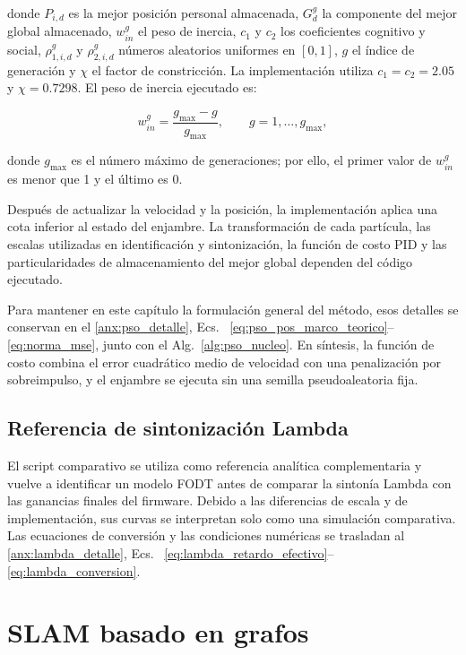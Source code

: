 \noindent donde $P_{i,d}$ es la mejor posición personal almacenada, $G_d^{g}$ la componente del mejor global almacenado, $w_{in}^{g}$ el peso de inercia, $c_1$ y $c_2$ los coeficientes cognitivo y social, $\rho_{1,i,d}^{g}$ y $\rho_{2,i,d}^{g}$ números aleatorios uniformes en $[0,1]$, $g$ el índice de generación y $\chi$ el factor de constricción. La implementación utiliza $c_1=c_2=2.05$ y $\chi=0.7298$. El peso de inercia ejecutado es:

\begin{equation}
w_{in}^{g}
=
\frac{g_{\max}-g}{g_{\max}},
\qquad
g=1,\ldots,g_{\max},
\label{eq:pso_inercia}
\end{equation}

\noindent donde $g_{\max}$ es el número máximo de generaciones; por ello, el primer valor de $w_{in}^{g}$ es menor que 1 y el último es 0.

Después de actualizar la velocidad y la posición, la implementación aplica
una cota inferior al estado del enjambre. La transformación de cada partícula,
las escalas utilizadas en identificación y sintonización, la función de costo
PID y las particularidades de almacenamiento del mejor global dependen del
código ejecutado.

Para mantener en este capítulo la formulación general del método, esos detalles
se conservan en el \ref{anx:pso_detalle}, Ecs.~
\eqref{eq:pso_pos_marco_teorico}--\eqref{eq:norma_mse}, junto con el
Alg.~\ref{alg:pso_nucleo}. En síntesis, la función de costo combina el error
cuadrático medio de velocidad con una penalización por sobreimpulso, y el
enjambre se ejecuta sin una semilla pseudoaleatoria fija.

\subsection{Referencia de sintonización Lambda}
\label{sec:lambda}

El script comparativo  se utiliza como
referencia analítica complementaria y vuelve a identificar un modelo FODT antes
de comparar la sintonía Lambda con las ganancias finales del firmware. Debido a
las diferencias de escala y de implementación, sus curvas se interpretan solo
como una simulación comparativa. Las ecuaciones de conversión y las condiciones
numéricas se trasladan al \ref{anx:lambda_detalle}, Ecs.~
\eqref{eq:lambda_retardo_efectivo}--\eqref{eq:lambda_conversion}.

\section{SLAM basado en grafos}
\label{sec:slam}

